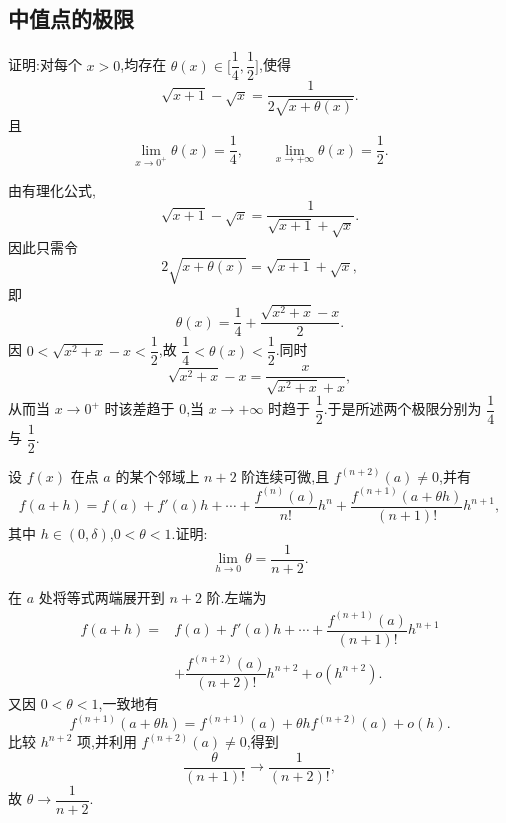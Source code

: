 \subsection{中值点的极限}

\begin{example}
    证明:对每个 $x>0$,均存在 $\theta(x)\in\lbrack \dfrac{1}{4},\dfrac{1}{2}\rbrack$,使得
    \[
        \sqrt{x+1}-\sqrt{x}=\dfrac{1}{2\sqrt{x+\theta(x)}}.
    \]
    且
    \[
        \displaystyle\lim\limits_{x\to0^+}\theta(x)=\dfrac{1}{4},
        \qquad
        \lim\limits_{x\to+\infty}\theta(x)=\dfrac{1}{2}.
    \]
\end{example}
\exampleblank

\begin{solution}
    由有理化公式,
    \[
        \sqrt{x+1}-\sqrt{x}
        =\dfrac{1}{\sqrt{x+1}+\sqrt{x}}.
    \]
    因此只需令
    \[
        2\sqrt{x+\theta(x)}=\sqrt{x+1}+\sqrt{x},
    \]
    即
    \[
        \theta(x)=\dfrac{1}{4}
        +\dfrac{\sqrt{x^2+x}-x}{2}.
    \]
    因 $0<\sqrt{x^2+x}-x<\dfrac{1}{2}$,故 $\dfrac{1}{4}<\theta(x)<\dfrac{1}{2}$.同时
    \[
        \sqrt{x^2+x}-x
        =\dfrac{x}{\sqrt{x^2+x}+x},
    \]
    从而当 $x\to0^+$ 时该差趋于 $0$,当 $x\to+\infty$ 时趋于 $\dfrac{1}{2}$.于是所述两个极限分别为 $\dfrac{1}{4}$ 与 $\dfrac{1}{2}$.
\end{solution}

\begin{example}
    设 $f(x)$ 在点 $a$ 的某个邻域上 $n+2$ 阶连续可微,且 $f^{(n+2)}(a)\neq0$,并有
    \[
        f(a+h)=f(a)+f'(a)h+\cdots+\dfrac{f^{(n)}(a)}{n!}h^n
        +\dfrac{f^{(n+1)}(a+\theta h)}{(n+1)!}h^{n+1},
    \]
    其中 $h\in(0,\delta)$,$0<\theta<1$.证明:
    \[
        \displaystyle\lim\limits_{h\to0}\theta=\dfrac{1}{n+2}.
    \]
\end{example}
\exampleblank

\begin{solution}
    在 $a$ 处将等式两端展开到 $n+2$ 阶.左端为
    \[
        \begin{aligned}
            f(a+h)={} & f(a)+f'(a)h+\cdots
            +\dfrac{f^{(n+1)}(a)}{(n+1)!}h^{n+1}                         \\
                      & +\dfrac{f^{(n+2)}(a)}{(n+2)!}h^{n+2}+o(h^{n+2}).
        \end{aligned}
    \]
    又因 $0<\theta<1$,一致地有
    \[
        f^{(n+1)}(a+\theta h)
        =f^{(n+1)}(a)+\theta h f^{(n+2)}(a)+o(h).
    \]
    比较 $h^{n+2}$ 项,并利用 $f^{(n+2)}(a)\neq0$,得到
    \[
        \dfrac{\theta}{(n+1)!}\longrightarrow\dfrac{1}{(n+2)!},
    \]
    故 $\theta\to\dfrac{1}{n+2}$.
\end{solution}

